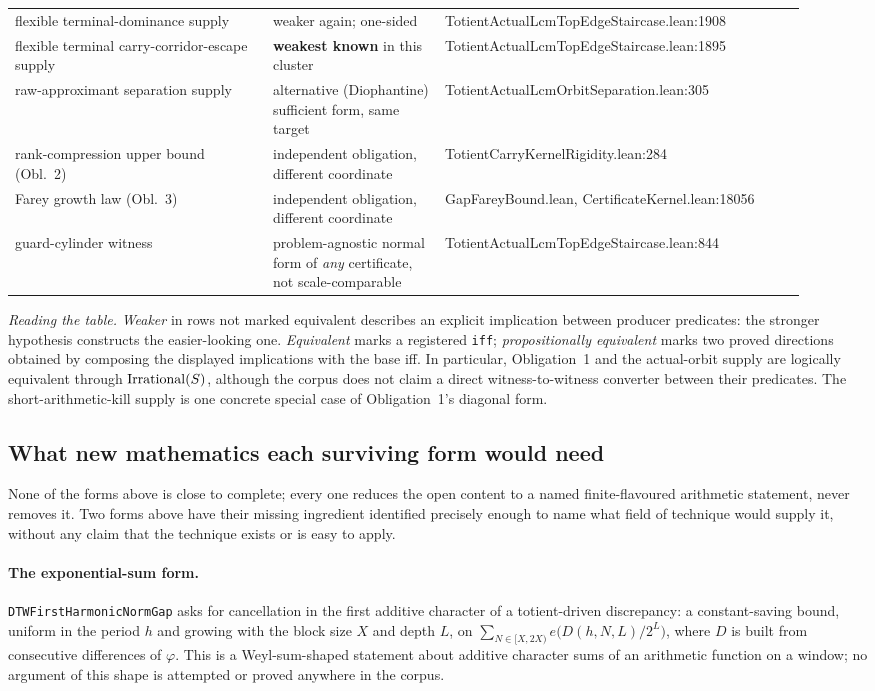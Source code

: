 \documentclass[11pt]{article}
\theoremstyle{plain}
\theoremstyle{definition}
\theoremstyle{remark}
\let\origmathrm\mathrm
\renewcommand{\mathrm}[1]{\ifmmode\origmathrm{#1}\else\textrm{#1}\fi}%
\begin{document}
\begin{center}
\begin{longtable}{p{0.30\linewidth} p{0.20\linewidth} p{0.42\linewidth}}
flexible terminal-dominance supply & weaker again; one-sided & TotientActualLcmTopEdgeStaircase.lean:1908 \\
flexible terminal carry-corridor-escape supply & \textbf{weakest known} in this cluster & TotientActualLcmTopEdgeStaircase.lean:1895 \\
raw-approximant separation supply & alternative (Diophantine) sufficient form, same target & TotientActualLcmOrbitSeparation.lean:305 \\
rank-compression upper bound (Obl.\ 2) & independent obligation, different coordinate & TotientCarryKernelRigidity.lean:284 \\
Farey growth law (Obl.\ 3) & independent obligation, different coordinate & GapFareyBound.lean, CertificateKernel.lean:18056 \\
guard-cylinder witness & problem-agnostic normal form of \emph{any} certificate, not scale-comparable & TotientActualLcmTopEdgeStaircase.lean:844 \\
\end{longtable}
\end{center}

\emph{Reading the table.} \emph{Weaker} in rows not marked
equivalent describes an explicit implication between producer predicates:
the stronger hypothesis constructs the easier-looking one.
\emph{Equivalent} marks a registered \texttt{iff};
\emph{propositionally equivalent} marks two proved directions obtained by
composing the displayed implications with the base iff.  In particular,
Obligation~1 and the actual-orbit supply are logically equivalent through
$\mathrm{Irrational}(S)$, although the corpus does not claim a direct
witness-to-witness converter between their predicates.  The
short-arithmetic-kill supply is one concrete special case of Obligation~1's
diagonal form.

\subsection{What new mathematics each surviving form would need}

None of the forms above is close to complete; every one reduces the open
content to a named finite-flavoured arithmetic statement, never removes it.
Two forms above have their missing ingredient identified precisely enough
to name what field of technique would supply it, without any claim that the
technique exists or is easy to apply.

\paragraph{The exponential-sum form.} \texttt{DTWFirstHarmonicNormGap} asks
for cancellation in the first additive character of a totient-driven
discrepancy: a constant-saving bound, uniform in the period $h$ and growing
with the block size $X$ and depth $L$, on
$\sum_{N\in[X,2X)} e\bigl(D(h,N,L)/2^L\bigr)$, where $D$ is built from
consecutive differences of $\varphi$. This is a Weyl-sum-shaped statement
about additive character sums of an arithmetic function on a window; no
argument of this shape is attempted or proved anywhere in the corpus.
\end{document}
